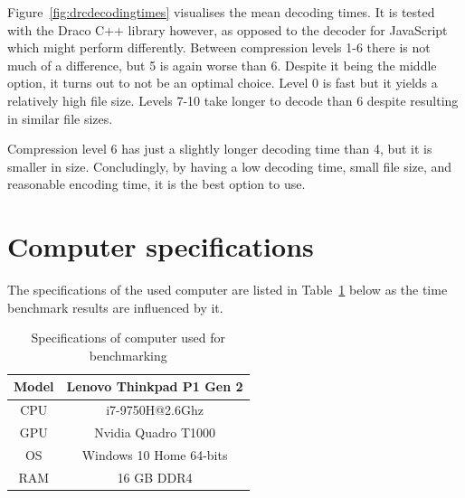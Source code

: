 Figure~\ref{fig:drcdecodingtimes} visualises the mean decoding times.
It is tested with the Draco C++ library however, as opposed to the decoder for JavaScript which might perform differently.
Between compression levels 1-6 there is not much of a difference, but 5 is again worse than 6.
Despite it being the middle option, it turns out to not be an optimal choice.
Level 0 is fast but it yields a relatively high file size.
Levels 7-10 take longer to decode than 6 despite resulting in similar file sizes.

Compression level 6 has just a slightly longer decoding time than 4, but it is smaller in size.
Concludingly, by having a low decoding time, small file size, and reasonable encoding time, it is the best option to use.










\section{Computer specifications}
The specifications of the used computer are listed in Table~\ref{tab:pcspecs} below as the time benchmark results are influenced by it.

\begin{table}[h!]
\begin{center}
 \begin{tabular}{ |c | c|} 
 \hline
Model & Lenovo Thinkpad P1 Gen 2 \\ 
\hline
\hline
CPU   & i7-9750H@2.6Ghz          \\
\hline
GPU   & Nvidia Quadro T1000      \\
\hline
OS    & Windows 10 Home 64-bits  \\ 
\hline
RAM   & 16 GB DDR4  \\          
\hline 
\end{tabular}
\caption{Specifications of computer used for benchmarking}
\label{tab:pcspecs}
\end{center}
\end{table}

